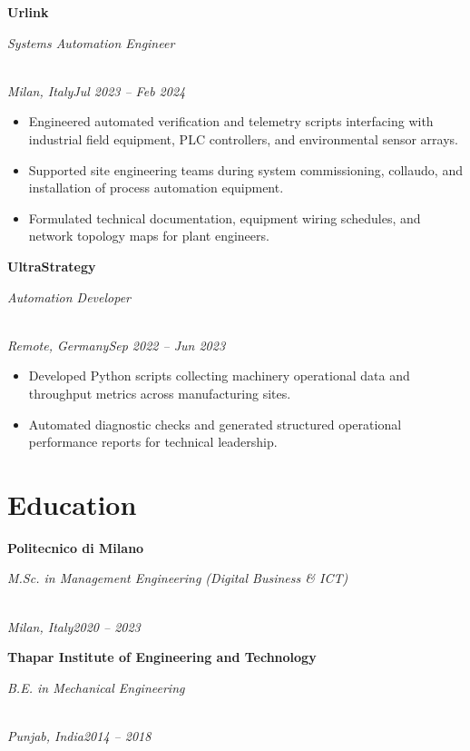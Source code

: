 \documentclass[a4paper,10pt]{article}
\newcommand{\role}[4]{\vspace{3pt}\noindent\hspace{0.6em}\parbox[t]{0.38\textwidth}{\raggedright\textbf{#1}}\hfill\parbox[t]{0.58\textwidth}{\raggedleft\textit{#2}}\\{\textit{#3}\hfill\textit{#4}}\vspace{1pt}}
\begin{document}
\role{Urlink}{Systems Automation Engineer}{Milan, Italy}{Jul 2023 -- Feb 2024}
\begin{itemize}
\item Engineered automated verification and telemetry scripts interfacing with industrial field equipment, PLC controllers, and environmental sensor arrays.
\item Supported site engineering teams during system commissioning, collaudo, and installation of process automation equipment.
\item Formulated technical documentation, equipment wiring schedules, and network topology maps for plant engineers.
\end{itemize}

\role{UltraStrategy}{Automation Developer}{Remote, Germany}{Sep 2022 -- Jun 2023}
\begin{itemize}
\item Developed Python scripts collecting machinery operational data and throughput metrics across manufacturing sites.
\item Automated diagnostic checks and generated structured operational performance reports for technical leadership.
\end{itemize}

\section{Education}
\role{Politecnico di Milano}{M.Sc. in Management Engineering (Digital Business \& ICT)}{Milan, Italy}{2020 -- 2023}
\role{Thapar Institute of Engineering and Technology}{B.E. in Mechanical Engineering}{Punjab, India}{2014 -- 2018}
\end{document}
